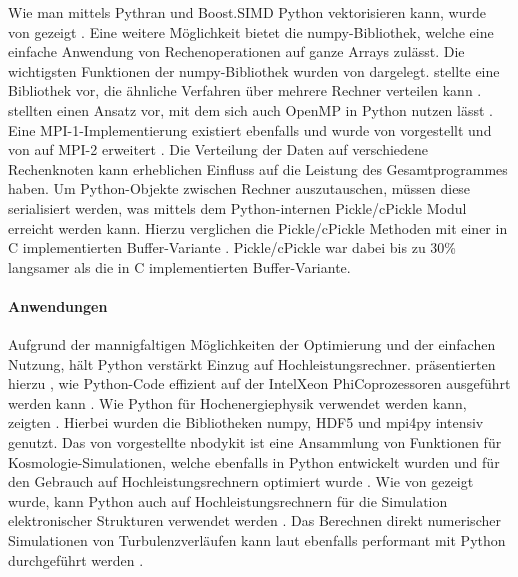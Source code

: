 Wie man mittels Pythran und Boost.SIMD Python vektorisieren kann, wurde \citeyear{GFB14} von \citeauthor{GFB14} gezeigt \cite{GFB14}. Eine weitere Möglichkeit bietet die numpy-Bibliothek, welche eine einfache Anwendung von Rechenoperationen auf ganze Arrays zulässt. Die wichtigsten Funktionen der numpy-Bibliothek wurden von \citeauthor{VCV11} dargelegt. \citeauthor{Dai09} stellte \citeyear{Dai09} eine Bibliothek vor, die ähnliche Verfahren über mehrere Rechner verteilen kann \cite{Dai09}. \citeauthor{GBA13} stellten \citeyear{GBA13} einen Ansatz vor, mit dem sich auch OpenMP in Python nutzen lässt \cite{GBA13}. Eine MPI-1-Implementierung existiert ebenfalls und wurde \citeyear{DPS05} von \citeauthor{DPS05} vorgestellt und \citeyear{DPS+08} von \citeauthor{DPS+08} auf MPI-2 erweitert \cite{DPS05,DPS+08}. Die Verteilung der Daten auf verschiedene Rechenknoten kann erheblichen Einfluss auf die Leistung des Gesamtprogrammes haben. Um Python-Objekte zwischen Rechner auszutauschen, müssen diese serialisiert werden, was mittels dem Python-internen Pickle/cPickle Modul erreicht werden kann. Hierzu verglichen \citeauthor{DPK+11} die Pickle/cPickle Methoden mit einer in C implementierten Buffer-Variante \cite{DPK+11}. Pickle/cPickle war dabei bis zu 30\% langsamer als die in C implementierten Buffer-Variante. 

\paragraph{Anwendungen}

Aufgrund der mannigfaltigen Möglichkeiten der Optimierung und der einfachen Nutzung, hält Python verstärkt Einzug auf Hochleistungsrechner. \citeauthor{KE14} präsentierten hierzu \citeyear{KE14}, wie Python-Code effizient auf der Intel\textregistered Xeon Phi\texttrademark Coprozessoren ausgeführt werden kann \cite{KE14}. Wie Python für Hochenergiephysik verwendet werden kann, zeigten \citeauthor{SKP+17} \cite{SKP+17}. Hierbei wurden die Bibliotheken numpy, HDF5 und mpi4py intensiv genutzt. Das von \citeauthor{HF17} vorgestellte nbodykit ist eine Ansammlung von Funktionen für Kosmologie-Simulationen, welche ebenfalls in Python entwickelt wurden und für den Gebrauch auf Hochleistungsrechnern optimiert wurde \cite{HF17}. Wie \citeyear{ERS+11} von \citeauthor{ERS+11} gezeigt wurde, kann Python auch auf Hochleistungsrechnern für die Simulation elektronischer Strukturen verwendet werden \cite{ERS+11}. Das Berechnen direkt numerischer Simulationen von Turbulenzverläufen kann laut \citeauthor{ML16} ebenfalls performant mit Python durchgeführt werden \cite{ML16}.

